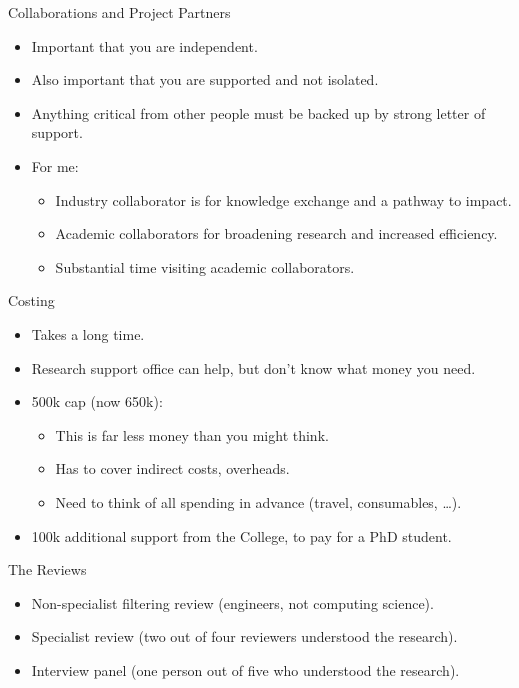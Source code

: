 \documentclass[aspectratio=169,compress,10pt]{beamer}
\begin{document}
\begin{frame}{Collaborations and Project Partners}
    \begin{itemize}
        \item Important that you are independent.
        \item Also important that you are supported and not isolated.
        \item Anything critical from other people must be backed up by strong letter of support.
        \item For me:
            \begin{itemize}
                \item Industry collaborator is for knowledge exchange and a pathway to impact.
                \item Academic collaborators for broadening research and increased efficiency.
                \item Substantial time visiting academic collaborators.
            \end{itemize}
    \end{itemize}
\end{frame}

\begin{frame}{Costing}
    \begin{itemize}
        \item Takes a long time.
        \item Research support office can help, but don't know what money you need.
        \item \textsterling{}500k cap (now \textsterling{}650k):
            \begin{itemize}
                \item This is far less money than you might think.
                \item Has to cover indirect costs, overheads.
                \item Need to think of all spending in advance (travel, consumables, \ldots).
            \end{itemize}
        \item \textsterling{}100k additional support from the College, to pay for a PhD student.
    \end{itemize}
\end{frame}

\begin{frame}{The Reviews}
    \begin{itemize}
        \item Non-specialist filtering review (engineers, not computing science).
        \item Specialist review (two out of four reviewers understood the research).
        \item Interview panel (one person out of five who understood the research).
    \end{itemize}
\end{frame}
\end{document}
